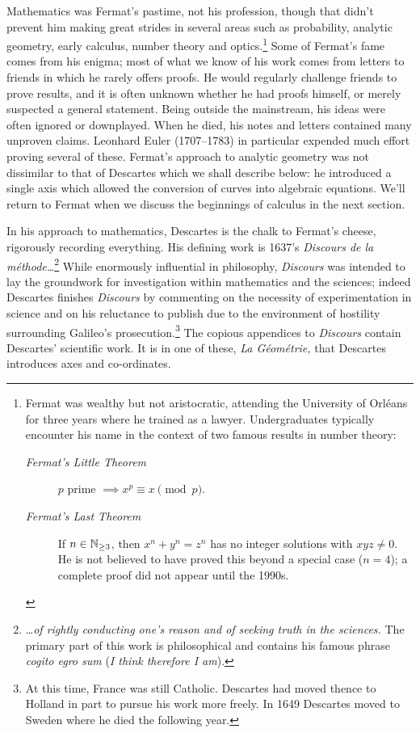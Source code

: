  Mathematics was Fermat's pastime, not his profession, though that didn't prevent him making great strides in several areas such as probability, analytic geometry, early calculus, number theory and  optics.\footnote{Fermat was wealthy but not aristocratic, attending the University of Orléans for three years where he trained as a lawyer. Undergraduates typically encounter his name in the context of two famous results in number theory: 
\begin{description}
\item[\normalfont\emph{Fermat's Little Theorem}] $p$ prime $\implies x^{p}\equiv x\pmod p$.
\item[\normalfont\emph{Fermat's Last Theorem}] If $n\in\mathbb{N}_{\ge 3}$, then $x^n+y^n=z^n$ has no integer solutions with $xyz\neq 0$. He is not believed to have proved this beyond a special case ($n=4$); a complete proof did not appear until the 1990s. 
\end{description}} Some of Fermat's fame comes from his enigma; most of what we know of his work comes from letters to friends in which he rarely offers proofs. He would regularly challenge friends to prove results, and it is often unknown whether he had proofs himself, or merely suspected a general statement. Being outside the mainstream, his ideas were often ignored or downplayed. When he died, his notes and letters contained many unproven claims. Leonhard Euler (1707--1783) in particular expended much effort proving several of these.\smallbreak
Fermat's approach to analytic geometry was not dissimilar to that of Descartes which we shall describe below: he introduced a single axis which allowed the conversion of curves into algebraic equations. We'll return to Fermat when we discuss the beginnings of calculus in the next section.

 In his approach to mathematics, Descartes is the chalk to Fermat's cheese, rigorously recording everything. His defining work is 1637's \emph{Discours de la méthode\ldots}\footnote{\ldots \emph{of rightly conducting one's reason and of seeking truth in the sciences.} The primary part of this work is philosophical and contains his famous phrase \emph{cogito egro sum} (\emph{I think therefore I am}).} While enormously influential in philosophy, \emph{Discours} was intended to lay the groundwork for investigation within mathematics and the sciences; indeed Descartes finishes \emph{Discours} by commenting on the necessity of experimentation in science and on his reluctance to publish due to the environment of hostility surrounding Galileo's prosecution.\footnote{At this time, France was still Catholic. Descartes had moved thence to Holland in part to pursue his work more freely. In 1649 Descartes moved to Sweden where he died the following year.} The copious appendices to \emph{Discours} contain Descartes' scientific work. It is in one of these, \emph{La Géométrie,} that Descartes introduces axes and co-ordinates.
\par


